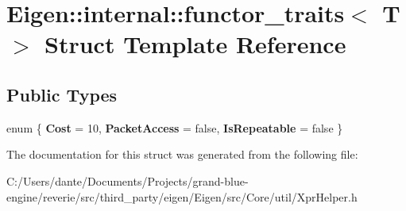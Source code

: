 \hypertarget{struct_eigen_1_1internal_1_1functor__traits}{}\section{Eigen\+::internal\+::functor\+\_\+traits$<$ T $>$ Struct Template Reference}
\label{struct_eigen_1_1internal_1_1functor__traits}
\subsection*{Public Types}
\begin{DoxyCompactItemize}
\item 
\mbox{\label{struct_eigen_1_1internal_1_1functor__traits_ae62070ceefe7c44fed400c07877c7aa4}} 
enum \{ {\bfseries Cost} = 10, 
{\bfseries Packet\+Access} = false, 
{\bfseries Is\+Repeatable} = false
 \}
\end{DoxyCompactItemize}


The documentation for this struct was generated from the following file\+:\begin{DoxyCompactItemize}
\item 
C\+:/\+Users/dante/\+Documents/\+Projects/grand-\/blue-\/engine/reverie/src/third\+\_\+party/eigen/\+Eigen/src/\+Core/util/Xpr\+Helper.\+h\end{DoxyCompactItemize}
